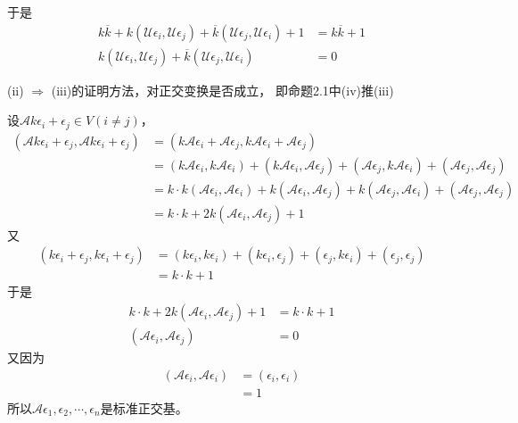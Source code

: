 \documentclass{article}
\begin{document}
于是
\begin{align*}
  k \overline{k} + k(\mathscr{U} \epsilon_i, \mathscr{U}\epsilon_j) + \overline{k}(\mathscr{U}\epsilon_j, \mathscr{U} \epsilon_i) + 1 & = k \overline{k} + 1 \\
  k(\mathscr{U} \epsilon_i, \mathscr{U}\epsilon_j) + \overline{k}(\mathscr{U}\epsilon_j, \mathscr{U} \epsilon_i)                      & = 0
\end{align*}

\begin{zremark}
  (ii) $\Rightarrow$ (iii)的证明方法，对正交变换是否成立，
  即命题2.1中(iv)推(iii)
\end{zremark}

设$\mathscr{A} k\epsilon_i + \epsilon_j \in V (i \neq j)$，
\begin{align*}
  (\mathscr{A} k\epsilon_i + \epsilon_j, \mathscr{A} k\epsilon_i + \epsilon_j)
   & = (k\mathscr{A} \epsilon_i + \mathscr{A}\epsilon_j, k\mathscr{A} \epsilon_i + \mathscr{A}\epsilon_j) \\
   & = (k\mathscr{A} \epsilon_i, k\mathscr{A} \epsilon_i)
  + (k\mathscr{A} \epsilon_i, \mathscr{A}\epsilon_j)
  + (\mathscr{A}\epsilon_j, k\mathscr{A} \epsilon_i)
  + (\mathscr{A}\epsilon_j, \mathscr{A}\epsilon_j)                                                        \\
   & = k \cdot k(\mathscr{A} \epsilon_i, \mathscr{A} \epsilon_i)
  + k(\mathscr{A} \epsilon_i, \mathscr{A}\epsilon_j)
  + k(\mathscr{A}\epsilon_j, \mathscr{A} \epsilon_i)
  + (\mathscr{A}\epsilon_j, \mathscr{A}\epsilon_j)                                                        \\
   & = k\cdot k + 2k(\mathscr{A} \epsilon_i, \mathscr{A}\epsilon_j) + 1
\end{align*}
又
\begin{align*}
  (k\epsilon_i + \epsilon_j, k\epsilon_i + \epsilon_j)
   & = (k\epsilon_i, k\epsilon_i)
  + (k\epsilon_i, \epsilon_j)
  + (\epsilon_j, k\epsilon_i)
  + (\epsilon_j, \epsilon_j)      \\
   & = k \cdot k + 1
\end{align*}
于是
\begin{align*}
  k\cdot k + 2k(\mathscr{A} \epsilon_i, \mathscr{A}\epsilon_j) + 1 & = k \cdot k + 1 \\
  (\mathscr{A} \epsilon_i, \mathscr{A}\epsilon_j)                  & = 0
\end{align*}
又因为
\begin{align*}
  (\mathscr{A} \epsilon_i, \mathscr{A}\epsilon_i)
   & = (\epsilon_i, \epsilon_i) \\
   & = 1
\end{align*}
所以$\mathscr{A} \epsilon_1, \epsilon_2, \cdots, \epsilon_n$是标准正交基。
\end{document}
